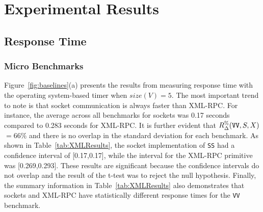 \documentclass{sig-alternate}
\begin{document}

\vspace*{-.1in}
\section{Experimental Results}
\label{sec:results}

\subsection{Response Time}
\label{sec:time-overhead}


\subsubsection{Micro Benchmarks}


Figure~\ref{fig:baselines}(a) presents the results from measuring
response time with the operating system-based timer when $size(V)=5$.
The most important trend to note is that socket communication is
always faster than XML-RPC.  For instance, the average across all
benchmarks for sockets was 0.17 seconds compared to 0.283 seconds for
XML-RPC.  It is further evident that {\small $R_\Delta^\%(\mbox{{\tt
      VV}},S,X)$}$ = 66\%$ and there is no overlap in the standard
deviation for each benchmark. As shown in Table~\ref{tab:XMLResults},
the socket implementation of \texttt{SS} had a confidence interval of
[0.17,0.17], while the interval for the XML-RPC primitive was
[0.269,0.293].  These results are significant because the confidence
intervals do not overlap and the result of the t-test was to reject
the null hypothesis.  Finally, the summary information in
Table~\ref{tab:XMLResults} also demonstrates that sockets and XML-RPC
have statistically different response times for the \texttt{VV}
benchmark.
\end{document}
